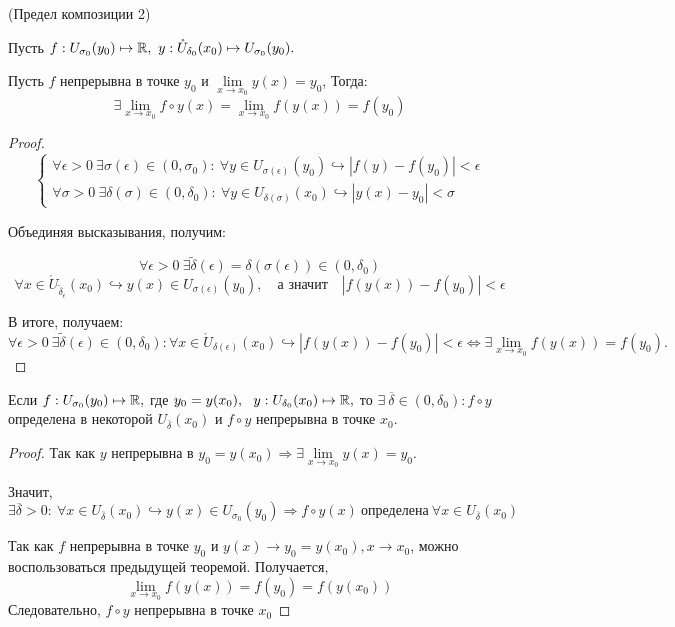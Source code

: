 \begin{theorem}
    \hypertarget{thrm4.18}{(Предел композиции 2)} Пусть $f: U_{\sigma_{0}} (y_{0}) \mapsto \mathbb{R}, \  y: \mathring{U}_{\delta_{0}} (x_{0}) \mapsto U_{\sigma_{0}}(y_{0}). $

    Пусть $f$ непрерывна в точке $y_0$ и $\lim\limits_{x \to x_{0}} y(x) = y_{0}$, Тогда:
    $$ \exists \lim\limits_{x \to x_{0}} f \circ y(x) = \lim\limits_{x\to x_{0}} f(y(x)) = f(y_{0})
    $$
\end{theorem} 
\begin{proof}
    $$\begin{cases}
        \forall \epsilon > 0 \ \exists \sigma(\epsilon) \in (0, \sigma_{0}): \ \forall y \in U_{\sigma(\epsilon)}(y_{0}) \hookrightarrow |f(y) - f(y_{0})| < \epsilon \\
        \forall \sigma > 0 \ \exists \delta(\sigma) \in (0, \delta_{0}): \ \forall y \in U_{\delta(\sigma)}(x_{0}) \hookrightarrow |y(x) - y_{0}| < \sigma            
    \end{cases}$$

    Объединяя высказывания, получим:

    $$
    \forall \epsilon > 0 \ \exists \widetilde{\delta}(\epsilon)=\delta(\sigma(\epsilon)) \in (0, \delta_{0})
    $$
    $$
    \forall x \in \mathring{U}_{\widetilde{\delta}_{\epsilon}}(x_{0}) \hookrightarrow y(x) \in U_{\sigma(\epsilon)}(y_{0}),\quad \textrm{а значит} \quad |f(y(x)) - f(y_{0})| < \epsilon
    $$

    В итоге, получаем:
    $$ \forall \epsilon > 0 \ \exists \widetilde{\delta}(\epsilon) \in (0, \delta_{0}): \forall x \in \mathring{U}_{\delta(\epsilon)}(x_{0}) \hookrightarrow  |f(y(x)) - f(y_{0})| < \epsilon \Leftrightarrow \exists\lim\limits_{x \to x_{0}} f(y(x)) = f(y_{0}).
    $$
\end{proof}

\begin{corollary}
    Если $f: U_{\sigma_{0}} (y_{0}) \mapsto \mathbb{R},$ где $y_{0} = y(x_{0}),  \ \ y: U_{\delta_{0}}(x_{0}) \mapsto \mathbb{R},$ то $\exists \ \overline{\delta} \in (0, \delta_{0}): f \circ y$ определена в некоторой $U_{\overline{\delta}}(x_{0})$ и $f \circ y$ непрерывна в точке $x_0$.
\end{corollary}
\begin{proof}
    Так как $y$ непрерывна в $y_{0} = y(x_{0}) \Rightarrow \exists \lim\limits_{x \to x_{0}} y(x) = y_{0}$.

    Значит, $\exists \overline{\delta} > 0: \ \forall x \in U_{\overline{\delta}}(x_{0}) \hookrightarrow y(x) \in U_{\sigma_{0}}(y_{0}) \Rightarrow f \circ y(x) \  \textrm{определена} \ \forall x\in U_{\overline{\delta}}(x_{0})$

    Так как $f$ непрерывна в точке $y_{0}$ и $y(x) \to y_{0} = y(x_{0}), x \to x_{0}$, можно воспользоваться предыдущей теоремой. Получается, 
    $$ \lim\limits_{x\to x_{0}} f(y(x)) = f(y_{0}) = f(y(x_{0}))
    $$
    Следовательно, $f \circ y$ непрерывна в точке $x_{0}$
\end{proof}

